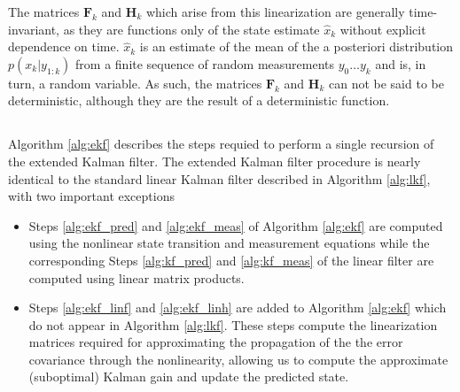 The matrices $\mathbf{F}_{k}$ and $\mathbf{H}_{k}$ which arise from this linearization are generally time-invariant, as they are functions only of the state estimate $\hat{x}_{k}$ without explicit dependence on time. $\hat{x}_{k}$ is an estimate of the mean of the a posteriori distribution $p(x_{k}|y_{1:k})$ from a finite sequence of random measurements $y_{0} \hdots y_{k}$ and is, in turn, a random variable. As such, the matrices $\mathbf{F}_{k}$ and $\mathbf{H}_{k}$ can not be said to be deterministic, although they are the result of a deterministic function.


\subsection{}

Algorithm \ref{alg:ekf} describes the steps requied to perform a single recursion of the extended Kalman filter. The extended Kalman filter procedure is nearly identical to the standard linear Kalman filter described in Algorithm \ref{alg:lkf}, with two important exceptions

\begin{itemize}

    \item Steps \ref{alg:ekf_pred} and \ref{alg:ekf_meas} of Algorithm \ref{alg:ekf} are computed using the nonlinear state transition and measurement equations while the corresponding Steps \ref{alg:kf_pred} and \ref{alg:kf_meas} of the linear filter are computed using linear matrix products.
    
    \item Steps \ref{alg:ekf_linf} and \ref{alg:ekf_linh} are added to Algorithm \ref{alg:ekf} which do not appear in Algorithm \ref{alg:lkf}. These steps compute the linearization matrices required for approximating the propagation of the the error covariance through the nonlinearity, allowing us to compute the approximate (suboptimal) Kalman gain and update the predicted state.
    
\end{itemize}


